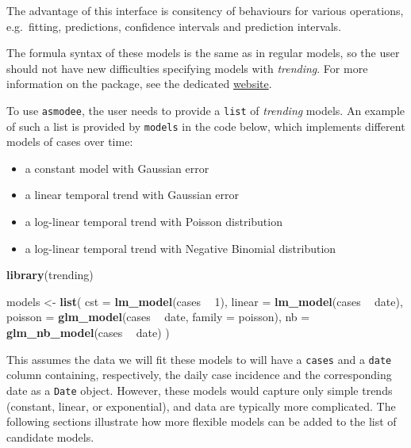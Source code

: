 \documentclass[]{book}
\newenvironment{Shaded}{\begin{snugshade}}{\end{snugshade}}
\newcommand{\DataTypeTok}[1]{\textcolor[rgb]{0.13,0.29,0.53}{#1}}
\newcommand{\DecValTok}[1]{\textcolor[rgb]{0.00,0.00,0.81}{#1}}
\newcommand{\KeywordTok}[1]{\textcolor[rgb]{0.13,0.29,0.53}{\textbf{#1}}}
\newcommand{\NormalTok}[1]{#1}
\newcommand{\OperatorTok}[1]{\textcolor[rgb]{0.81,0.36,0.00}{\textbf{#1}}}
\newcommand{\StringTok}[1]{\textcolor[rgb]{0.31,0.60,0.02}{#1}}
\providecommand{\tightlist}{%
  \setlength{\itemsep}{0pt}\setlength{\parskip}{0pt}}
\begin{document}
The advantage of this interface is consitency of behaviours for various
operations, e.g.~fitting, predictions, confidence intervals and prediction
intervals.

The formula syntax of these models is the same as in regular models, so the user
should not have new difficulties specifying models with \emph{trending}.
For more information on the package, see the dedicated
\href{https://www.repidemicsconsortium.org/trending/}{website}.

To use \texttt{asmodee}, the user needs to provide a \texttt{list} of \emph{trending} models. An
example of such a list is provided by \texttt{models} in the code below, which
implements different models of cases over time:

\begin{itemize}
\tightlist
\item
  a constant model with Gaussian error
\item
  a linear temporal trend with Gaussian error
\item
  a log-linear temporal trend with Poisson distribution
\item
  a log-linear temporal trend with Negative Binomial distribution
\end{itemize}

\begin{Shaded}
\begin{Highlighting}[]

\KeywordTok{library}\NormalTok{(trending)}

\NormalTok{models <-}\StringTok{ }\KeywordTok{list}\NormalTok{(}
  \DataTypeTok{cst =} \KeywordTok{lm_model}\NormalTok{(cases }\OperatorTok{~}\StringTok{ }\DecValTok{1}\NormalTok{),}
  \DataTypeTok{linear =} \KeywordTok{lm_model}\NormalTok{(cases }\OperatorTok{~}\StringTok{ }\NormalTok{date),}
  \DataTypeTok{poisson =} \KeywordTok{glm_model}\NormalTok{(cases }\OperatorTok{~}\StringTok{ }\NormalTok{date, }\DataTypeTok{family =}\NormalTok{ poisson),}
  \DataTypeTok{nb =} \KeywordTok{glm_nb_model}\NormalTok{(cases }\OperatorTok{~}\StringTok{ }\NormalTok{date)}
\NormalTok{)}
\end{Highlighting}
\end{Shaded}

This assumes the data we will fit these models to will have a \texttt{cases} and a
\texttt{date} column containing, respectively, the daily case incidence and the
corresponding date as a \texttt{Date} object. However, these models would capture only
simple trends (constant, linear, or exponential), and data are typically more
complicated. The following sections illustrate how more flexible models can be
added to the list of candidate models.
\end{document}
